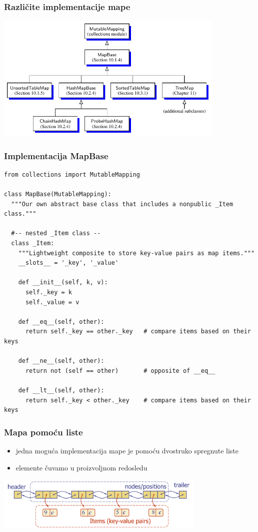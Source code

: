 \documentclass[compress,aspectratio=169]{beamer}
\begin{document}
\begin{frame}[fragile]
  \frametitle{Različite implementacije mape}
  \begin{center}
    \includegraphics[width=11cm]{asp-10-pic02.pdf}
  \end{center}
\end{frame}

\begin{frame}
  \frametitle{Implementacija MapBase}
\begin{verbatim}
from collections import MutableMapping

class MapBase(MutableMapping):
  """Our own abstract base class that includes a nonpublic _Item class."""

  #-- nested _Item class --
  class _Item:
    """Lightweight composite to store key-value pairs as map items."""
    __slots__ = '_key', '_value'

    def __init__(self, k, v):
      self._key = k
      self._value = v

    def __eq__(self, other):               
      return self._key == other._key   # compare items based on their keys

    def __ne__(self, other):
      return not (self == other)       # opposite of __eq__

    def __lt__(self, other):               
      return self._key < other._key    # compare items based on their keys
\end{verbatim}
\end{frame}

\begin{frame}[fragile]
  \frametitle{Mapa pomoću liste}
  \begin{itemize}
    \item jedna moguća implementacija mape je pomoću dvostruko spregnute liste 
    \item elemente čuvamo u proizvoljnom redosledu
  \end{itemize}
  \begin{center}
    \includegraphics[width=10cm]{asp-10-pic03.png}
  \end{center}
\end{frame}
\end{document}
